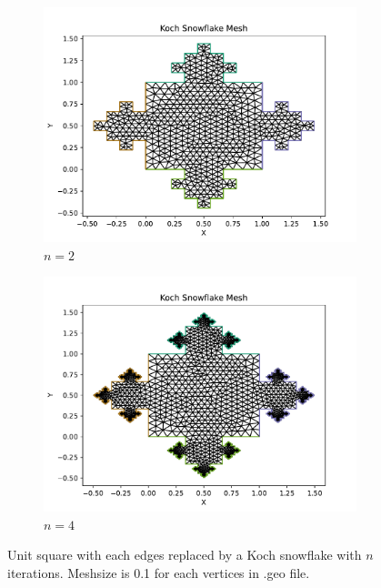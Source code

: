 \documentclass[12pt]{article}%
\theoremstyle{plain}
\numberwithin{equation}{section}
\begin{document}
  \begin{figure}[H]%
    \centering
         \begin{subfigure}[h]{0.45\linewidth}
         \caption{$n=2$}
\includegraphics[width=\linewidth]{figures/Ex3/Ex3_snow_square_2.pdf}
\end{subfigure}
 \begin{subfigure}[h]{0.45\linewidth}
 \caption{$n=4$}
\includegraphics[width=\linewidth]{figures/Ex3/Ex3_snow_square_4.pdf}
\end{subfigure}
  \caption{Unit square with each edges replaced by a Koch snowflake with $n$ iterations. Meshsize is 0.1 for each vertices in .geo file.}
  \label{fig:snow_2d_Dirichlet}
 \end{figure}
\end{document}
